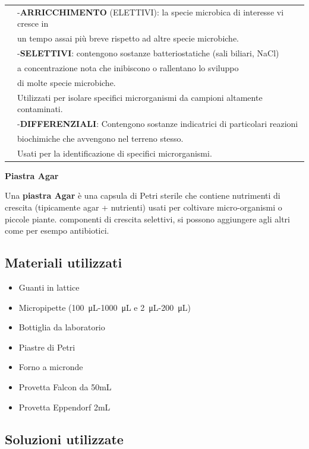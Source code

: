 \begin{tabular}{ll}
& -\textbf{ARRICCHIMENTO} (ELETTIVI): la specie microbica di interesse vi cresce in \\ \cline{1-1}
& un tempo assai più breve rispetto ad altre specie microbiche.\\
& -\textbf{SELETTIVI}: contengono sostanze batteriostatiche (sali biliari, NaCl) \\
&  a concentrazione nota che inibiscono o rallentano lo sviluppo \\
& di molte specie microbiche. \\
&  Utilizzati per isolare specifici microrganismi da campioni altamente contaminati.\\
& -\textbf{DIFFERENZIALI}: Contengono sostanze indicatrici di particolari reazioni \\
& biochimiche che avvengono nel terreno stesso. \\
& Usati per la identificazione di specifici microrganismi.\\


\end{tabular}

\textbf{Piastra Agar}
\vspace{0.3cm}

Una \textbf{piastra Agar} è una capsula di Petri sterile che contiene nutrimenti
di crescita (tipicamente agar + nutrienti) usati per coltivare micro-organismi o piccole piante.
componenti di crescita selettivi, si possono aggiungere agli altri come per esempo antibiotici.




\subsection{Materiali utilizzati}

\begin{itemize}
	\item Guanti in lattice
	\item Micropipette (\SI{100}{\micro\liter}-\SI{1000}{\micro\liter} e \SI{2}{\micro\liter}-\SI{200}{\micro\liter})
	\item Bottiglia da laboratorio
  \item Piastre di Petri
	\item Forno a micronde
  \item Provetta Falcon da 50mL
  \item Provetta Eppendorf 2mL

\end{itemize}

\subsection{Soluzioni utilizzate}

